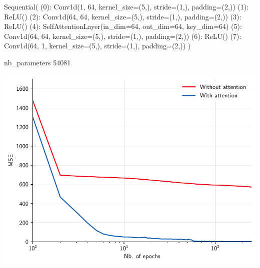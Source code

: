 \documentclass[c,8pt]{beamer}
\begin{document}
\begin{frame}[fragile]

\begin{rawsrc}[commandchars=\\\{\}]
Sequential(
  (0): Conv1d(1, 64, kernel_size=(5,), stride=(1,), padding=(2,))
  (1): ReLU()
  (2): Conv1d(64, 64, kernel_size=(5,), stride=(1,), padding=(2,))
  (3): ReLU()
  (4): SelfAttentionLayer(in_dim=64, out_dim=64, key_dim=64)
  (5): Conv1d(64, 64, kernel_size=(5,), stride=(1,), padding=(2,))
  (6): ReLU()
  (7): Conv1d(64, 1, kernel_size=(5,), stride=(1,), padding=(2,))
)

nb_parameters 54081
\end{rawsrc}


\end{frame}


\begin{frame}{}{}

\begin{center}
\includegraphics[width=\textwidth]{materials/attention/pics/slides/att1d_wa_train_log.pdf}
\end{center}


\end{frame}
\end{document}
